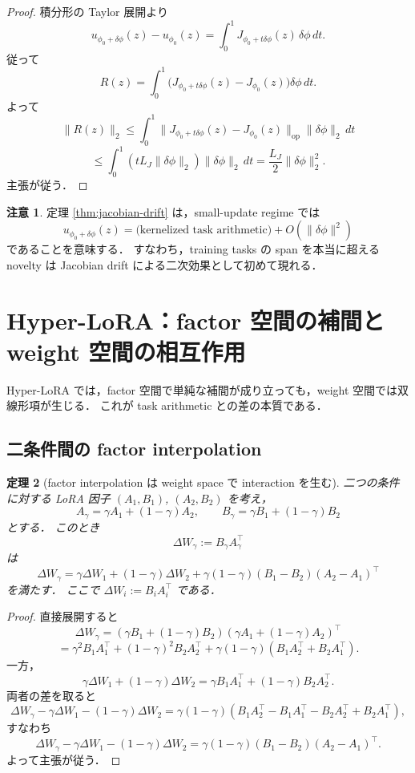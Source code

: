 \documentclass[a4paper,11pt]{bxjsarticle}
\newtheorem{theorem}{定理}[section]
\theoremstyle{definition}
\newtheorem{remark}[theorem]{注意}
\begin{document}
\begin{proof}
積分形の Taylor 展開より
\[
u_{\phi_0+\delta\phi}(z)-u_{\phi_0}(z)
=
\int_0^1 J_{\phi_0+t\delta\phi}(z)\,\delta\phi\,dt.
\]
従って
\[
R(z)
=
\int_0^1 \bigl(J_{\phi_0+t\delta\phi}(z)-J_{\phi_0}(z)\bigr)\delta\phi\,dt.
\]
よって
\[
\|R(z)\|_2
\le
\int_0^1 \|J_{\phi_0+t\delta\phi}(z)-J_{\phi_0}(z)\|_{\mathrm{op}}\|\delta\phi\|_2\,dt
\]
\[
\le
\int_0^1 (tL_J\|\delta\phi\|_2)\|\delta\phi\|_2\,dt
=
\frac{L_J}{2}\|\delta\phi\|_2^2.
\]
主張が従う．
\end{proof}

\begin{remark}
定理 \ref{thm:jacobian-drift} は，small-update regime では
\[
u_{\phi_0+\delta\phi}(z)=\text{(kernelized task arithmetic)} + O(\|\delta\phi\|^2)
\]
であることを意味する．
すなわち，training tasks の span を本当に超える novelty は Jacobian drift による二次効果として初めて現れる．
\end{remark}

\section{Hyper-LoRA：factor 空間の補間と weight 空間の相互作用}

Hyper-LoRA では，factor 空間で単純な補間が成り立っても，weight 空間では双線形項が生じる．
これが task arithmetic との差の本質である．

\subsection{二条件間の factor interpolation}

\begin{theorem}[factor interpolation は weight space で interaction を生む]
\label{thm:lora-interaction}
二つの条件に対する LoRA 因子 $(A_1,B_1)$, $(A_2,B_2)$ を考え，
\[
A_\gamma=\gamma A_1+(1-\gamma)A_2,\qquad
B_\gamma=\gamma B_1+(1-\gamma)B_2
\]
とする．
このとき
\[
\Delta W_\gamma := B_\gamma A_\gamma^\top
\]
は
\[
\boxed{
\Delta W_\gamma
=
\gamma \Delta W_1+(1-\gamma)\Delta W_2
+
\gamma(1-\gamma)(B_1-B_2)(A_2-A_1)^\top
}
\]
を満たす．
ここで $\Delta W_i:=B_iA_i^\top$ である．
\end{theorem}

\begin{proof}
直接展開すると
\[
\Delta W_\gamma
=
(\gamma B_1+(1-\gamma)B_2)(\gamma A_1+(1-\gamma)A_2)^\top
\]
\[
=
\gamma^2 B_1A_1^\top +(1-\gamma)^2 B_2A_2^\top
+\gamma(1-\gamma)(B_1A_2^\top + B_2A_1^\top).
\]
一方，
\[
\gamma\Delta W_1+(1-\gamma)\Delta W_2
=
\gamma B_1A_1^\top +(1-\gamma)B_2A_2^\top.
\]
両者の差を取ると
\[
\Delta W_\gamma-\gamma\Delta W_1-(1-\gamma)\Delta W_2
=
\gamma(1-\gamma)(B_1A_2^\top-B_1A_1^\top-B_2A_2^\top+B_2A_1^\top),
\]
すなわち
\[
\Delta W_\gamma-\gamma\Delta W_1-(1-\gamma)\Delta W_2
=
\gamma(1-\gamma)(B_1-B_2)(A_2-A_1)^\top.
\]
よって主張が従う．
\end{proof}
\end{document}
